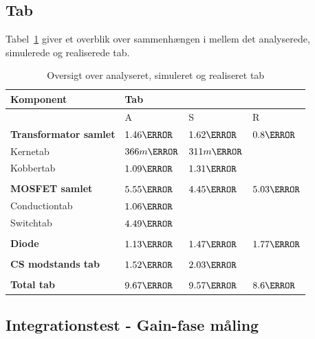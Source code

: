 \subsection{Tab}
Tabel~\ref{tab:realisering_tab} giver et overblik over sammenhængen i mellem det analyserede, simulerede og realiserede tab.
\begin{table}[H] 			
	\centering
	\begin{tabularx}{\textwidth}{|X|l|l|l|}
		\hline
		\textbf{\large Komponent} & \multicolumn{3}{|l|}{\textbf{\large Tab}} \\ \hline
		& A & S	& R\\ \hline
		\textbf{Transformator samlet} & $1.46\watt$ & $1.62\watt$ & $0.8\watt$\\ \hline 
		Kernetab & $366m\watt$ & $311m\watt$ &  \\ \hline
		Kobbertab & $1.09\watt$ & $1.31\watt$ & \\ \hline
		& &	& \\ \hline
		\textbf{MOSFET samlet} & $5.55\watt$ & $4.45\watt$ & $5.03\watt$\\ \hline
		Conductiontab & $1.06\watt$ & & \\ \hline
		Switchtab & $4.49\watt$ &  &    \\ \hline
		& &	& \\ \hline
		\textbf{Diode} & $1.13\watt$ & $1.47\watt$ & $1.77\watt$\\ \hline
		& &	& \\ \hline
		\textbf{CS modstands tab} & $1.52\watt$ & $2.03\watt$ & \\ \hline
		& &	& \\ \hline
		\textbf{Total tab} & $9.67\watt$ & $9.57\watt$ & $8.6\watt$\\ \hline
	\end{tabularx}
	\caption{Oversigt over analyseret, simuleret og realiseret tab}
	\label{tab:realisering_tab}
\end{table}

\subsection{Integrationstest - Gain-fase måling}

